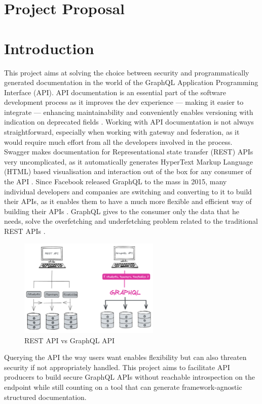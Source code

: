 \section{Project Proposal}
\label{s:Project-Proposal}

\section*{Introduction}
\label{s:Introduction}
This project aims at solving the choice between security and programmatically
generated documentation in the world of the GraphQL Application Programming
Interface (API). API documentation is an essential part of the software
development process as it improves the dev experience --- making it easier to
integrate --- enhancing maintainability and conveniently enables versioning with
indication on deprecated fields \citep{fanWhyAPIDocumentation2021}. Working with
API documentation is not always straightforward, especially when working with
gateway and federation, as it would require much effort from all the developers
involved in the process. Swagger makes documentation for Representational state
transfer (REST) APIs very uncomplicated, as it automatically generates HyperText
Markup Language (HTML) based visualisation and interaction out of the box for
any consumer of the API \citep{korenExploitationOpenAPIDocumentation2018}. Since
Facebook released GraphQL to the mass in 2015, many individual developers and
companies are switching and converting to it to build their APIs, as it enables
them to have a much more flexible and efficient way of building their APIs
\citep{britoRESTVsGraphQL2020}. GraphQL gives to the consumer only the data that
he needs, solve the overfetching and underfetching problem related to the
traditional REST APIs \citep{witternGeneratingGraphQLWrappersREST2018}.
\begin{figure}[H]
  \centering
  \includegraphics[width=0.6\textwidth]{figures/restvsgraph}
  \caption{REST API vs GraphQL API}
  \label{f:restvsgraph}
\end{figure}
Querying the API the way users want enables flexibility but can also threaten
security if not appropriately handled. This project aims to facilitate API
producers to build secure GraphQL APIs without reachable introspection on the
endpoint while still counting on a tool that can generate framework-agnostic
structured documentation.

